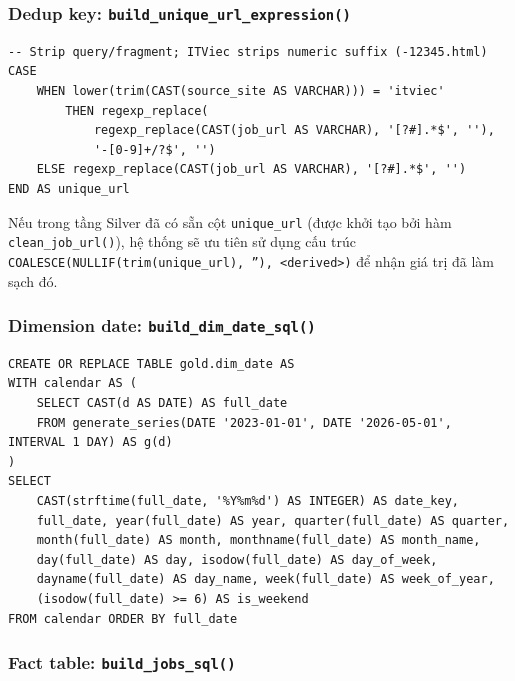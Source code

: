 \subsubsection{Dedup key: \texttt{build\_unique\_url\_expression()}}

\begin{lstlisting}[style=sqlstyle, caption={Unique URL dedup key (SQL)}, label={lst:unique-url-sql}]
-- Strip query/fragment; ITViec strips numeric suffix (-12345.html)
CASE
    WHEN lower(trim(CAST(source_site AS VARCHAR))) = 'itviec'
        THEN regexp_replace(
            regexp_replace(CAST(job_url AS VARCHAR), '[?#].*$', ''),
            '-[0-9]+/?$', '')
    ELSE regexp_replace(CAST(job_url AS VARCHAR), '[?#].*$', '')
END AS unique_url
\end{lstlisting}

Nếu trong tầng Silver đã có sẵn cột \texttt{unique\_url} (được khởi tạo bởi hàm \texttt{clean\_job\_url()}),
hệ thống sẽ ưu tiên sử dụng cấu trúc \texttt{COALESCE(NULLIF(trim(unique\_url), ''), <derived>)} để nhận giá trị đã làm sạch đó.

\subsubsection{Dimension date: \texttt{build\_dim\_date\_sql()}}

\begin{lstlisting}[style=sqlstyle, caption={dim\_date: generate\_series 2023--2026}, label={lst:dim-date-sql}]
CREATE OR REPLACE TABLE gold.dim_date AS
WITH calendar AS (
    SELECT CAST(d AS DATE) AS full_date
    FROM generate_series(DATE '2023-01-01', DATE '2026-05-01', INTERVAL 1 DAY) AS g(d)
)
SELECT
    CAST(strftime(full_date, '%Y%m%d') AS INTEGER) AS date_key,
    full_date, year(full_date) AS year, quarter(full_date) AS quarter,
    month(full_date) AS month, monthname(full_date) AS month_name,
    day(full_date) AS day, isodow(full_date) AS day_of_week,
    dayname(full_date) AS day_name, week(full_date) AS week_of_year,
    (isodow(full_date) >= 6) AS is_weekend
FROM calendar ORDER BY full_date
\end{lstlisting}

\subsubsection{Fact table: \texttt{build\_jobs\_sql()}}

